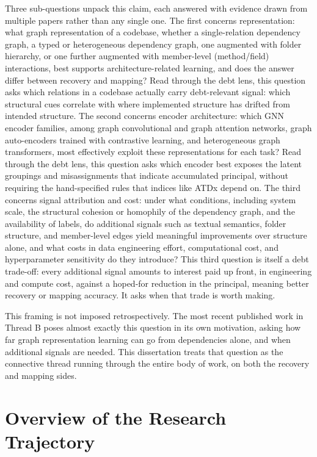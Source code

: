 Three sub-questions unpack this claim, each answered with evidence drawn from multiple papers rather than any single one. The first concerns representation: what graph representation of a codebase, whether a single-relation dependency graph, a typed or heterogeneous dependency graph, one augmented with folder hierarchy, or one further augmented with member-level (method/field) interactions, best supports architecture-related learning, and does the answer differ between recovery and mapping? Read through the debt lens, this question asks which relations in a codebase actually carry debt-relevant signal: which structural cues correlate with where implemented structure has drifted from intended structure. The second concerns encoder architecture: which GNN encoder families, among graph convolutional and graph attention networks, graph auto-encoders trained with contrastive learning, and heterogeneous graph transformers, most effectively exploit these representations for each task? Read through the debt lens, this question asks which encoder best exposes the latent groupings and misassignments that indicate accumulated principal, without requiring the hand-specified rules that indices like ATDx depend on. The third concerns signal attribution and cost: under what conditions, including system scale, the structural cohesion or homophily of the dependency graph, and the availability of labels, do additional signals such as textual semantics, folder structure, and member-level edges yield meaningful improvements over structure alone, and what costs in data engineering effort, computational cost, and hyperparameter sensitivity do they introduce? This third question is itself a debt trade-off: every additional signal amounts to interest paid up front, in engineering and compute cost, against a hoped-for reduction in the principal, meaning better recovery or mapping accuracy. It asks when that trade is worth making.

This framing is not imposed retrospectively. The most recent published work in Thread B poses almost exactly this question in its own motivation, asking how far graph representation learning can go from dependencies alone, and when additional signals are needed. This dissertation treats that question as the connective thread running through the entire body of work, on both the recovery and mapping sides.

\section{Overview of the Research Trajectory}
\label{sec:trajectory-overview}

